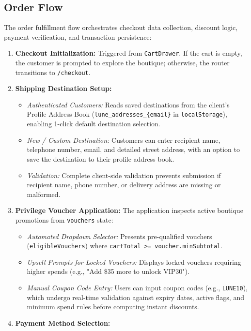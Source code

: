 \documentclass[12pt,a4paper,oneside]{report}
\begin{document}
\subsection{Order Flow}
The order fulfillment flow orchestrates checkout data collection, discount logic, payment verification, and transaction persistence:
\begin{enumerate}[leftmargin=1.2cm]
    \item \textbf{Checkout Initialization:}
    Triggered from \texttt{CartDrawer}. If the cart is empty, the customer is prompted to explore the boutique; otherwise, the router transitions to \texttt{/checkout}.
    \item \textbf{Shipping Destination Setup:}
    \begin{itemize}[nosep]
        \item \textit{Authenticated Customers:} Reads saved destinations from the client's Profile Address Book (\texttt{lune\_addresses\_\{email\}} in \texttt{localStorage}), enabling 1-click default destination selection.
        \item \textit{New / Custom Destination:} Customers can enter recipient name, telephone number, email, and detailed street address, with an option to save the destination to their profile address book.
        \item \textit{Validation:} Complete client-side validation prevents submission if recipient name, phone number, or delivery address are missing or malformed.
    \end{itemize}
    \item \textbf{Privilege Voucher Application:}
    The application inspects active boutique promotions from \texttt{vouchers} state:
    \begin{itemize}[nosep]
        \item \textit{Automated Dropdown Selector:} Presents pre-qualified vouchers (\texttt{eligibleVouchers}) where \texttt{cartTotal >= voucher.minSubtotal}.
        \item \textit{Upsell Prompts for Locked Vouchers:} Displays locked vouchers requiring higher spends (e.g., "Add \$35 more to unlock VIP30").
        \item \textit{Manual Coupon Code Entry:} Users can input coupon codes (e.g., \texttt{LUNE10}), which undergo real-time validation against expiry dates, active flags, and minimum spend rules before computing instant discounts.
    \end{itemize}
    \item \textbf{Payment Method Selection:}

\end{enumerate}
\end{document}
